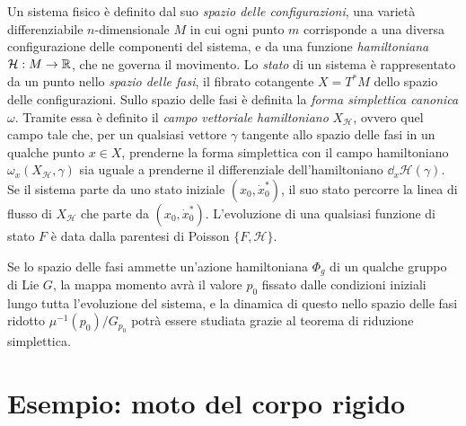Un sistema fisico è definito dal suo \emph{spazio delle configurazioni}, una varietà differenziabile $n$-dimensionale $M$ in cui ogni punto $m$ corrisponde a una diversa configurazione delle componenti del sistema, e da una funzione \emph{hamiltoniana} $\mathcal{H}: M\to \mathbb{R}$, che ne governa il movimento. Lo \emph{stato} di un sistema è rappresentato da un punto nello \emph{spazio delle fasi}, il fibrato cotangente $X = T^* M$ dello spazio delle configurazioni. Sullo spazio delle fasi è definita la \emph{forma simplettica canonica} $\omega$. Tramite essa è definito il \emph{campo vettoriale hamiltoniano} $X_{\mathcal{H}}$, ovvero quel campo tale che, per un qualsiasi vettore $\gamma$ tangente allo spazio delle fasi in un qualche punto $x \in X$, prenderne la forma simplettica con il campo hamiltoniano $\omega_{x}(X_{\mathcal{H}}, \gamma)$ sia uguale a prenderne il differenziale dell'hamiltoniano $\dd_{x}{\mathcal{H}}(\gamma)$. Se il sistema parte da uno stato iniziale $(x_0, \dot{x}^*_0)$, il suo stato percorre la linea di flusso di $X_{\mathcal{H}}$ che parte da $(x_0, \dot{x}^*_0)$. L'evoluzione di una qualsiasi funzione di stato $F$ è data dalla parentesi di Poisson $\{F, \mathcal{H}\}$.

Se lo spazio delle fasi ammette un'azione hamiltoniana $\Phi_g$ di un qualche gruppo di Lie $G$, la mappa momento avrà il valore $p_0$ fissato dalle condizioni iniziali lungo tutta l'evoluzione del sistema, e la dinamica di questo nello spazio delle fasi ridotto $\mu^{-1}(p_0)/G_{p_0}$ potrà essere studiata grazie al teorema di riduzione simplettica. 

\section{Esempio: moto del corpo rigido}


